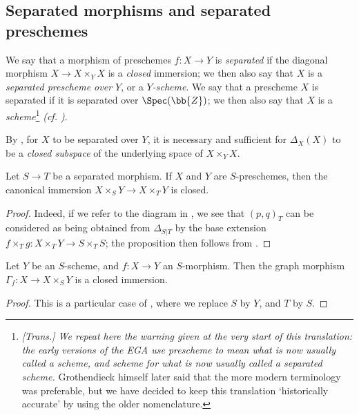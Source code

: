 \subsection{Separated morphisms and separated preschemes}
\label{subsection:I.5.4}
\label{I.5.4}

\begin{definition}[5.4.1]
\label{I.5.4.1}
We say that a morphism of preschemes $f:X\to Y$ is \emph{separated} if the diagonal morphism $X\to X\times_Y X$ is a \emph{closed} immersion; we then also say that $X$ is a \emph{separated prescheme over $Y$}, or a \emph{$Y$-scheme}.
We say that a prescheme $X$ is separated if it is separated over $\Spec(\bb{Z})$;
we then also say that $X$ is a \emph{scheme}\footnote{\emph{[Trans.] We repeat here the warning given at the very start of this translation: the early versions of the EGA use \emph{prescheme} to mean what is now usually called a scheme, and \emph{scheme} for what is now usually called a separated scheme.} Grothendieck himself later said that the more modern terminology was preferable, but we have decided to keep this translation `historically accurate' by using the older nomenclature.} \emph{(cf. )}.
\end{definition}

By , for $X$ to be separated over $Y$, it is necessary and sufficient for $\Delta_X(X)$ to be a \emph{closed subspace} of the underlying space of $X\times_Y X$.

\begin{proposition}[5.4.2]
\label{I.5.4.2}
Let $S\to T$ be a separated morphism.
If $X$ and $Y$ are $S$-preschemes, then the canonical immersion $X\times_S Y\to X\times_T Y$  is closed.
\end{proposition}

\begin{proof}
Indeed, if we refer to the diagram in , we see that $(p,q)_T$ can be considered as being obtained from $\Delta_{S|T}$ by the base extension $f\times_T g:X\times_T Y\to S\times_T S$;
the proposition then follows from .
\end{proof}

\begin{corollary}[5.4.3]
\label{I.5.4.3}
Let $Y$ be an $S$-scheme, and $f:X\to Y$ an $S$-morphism.
Then the graph morphism $\Gamma_f:X\to X\times_S Y$  is a closed immersion.
\end{corollary}

\begin{proof}
This is a particular case of , where we replace $S$ by $Y$, and $T$ by $S$.
\end{proof}

